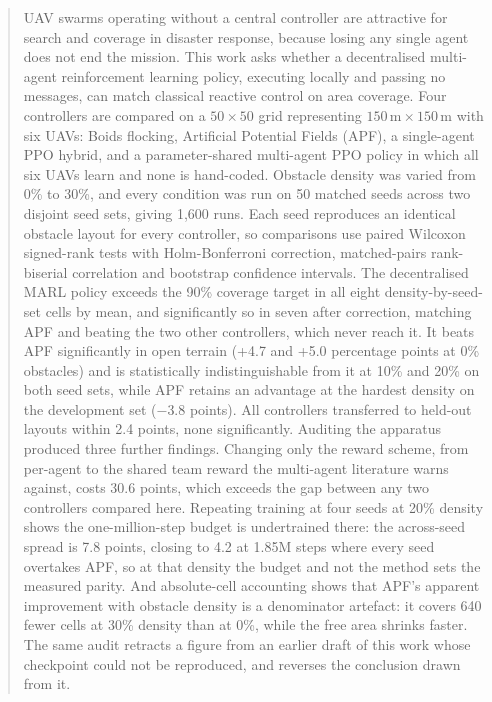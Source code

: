 \documentclass[a4paper, 10pt, conference]{ieeeconf}
\begin{document}
\begin{abstract}
UAV swarms operating without a central controller are attractive for
search and coverage in disaster response, because losing any single
agent does not end the mission. This work asks whether a
decentralised multi-agent reinforcement learning policy, executing
locally and passing no messages, can match classical reactive control
on area coverage. Four controllers are
compared on a $50\times50$ grid representing
$150\,\text{m}\times150\,\text{m}$ with six UAVs: Boids flocking,
Artificial Potential Fields (APF), a single-agent PPO hybrid, and a
parameter-shared multi-agent PPO policy in which all six UAVs learn
and none is hand-coded. Obstacle density was varied from 0\% to 30\%,
and every condition was run on 50 matched seeds across two disjoint
seed sets, giving 1{,}600 runs. Each seed reproduces an identical
obstacle layout for every controller, so comparisons use paired
Wilcoxon signed-rank tests with Holm-Bonferroni correction,
matched-pairs rank-biserial correlation and bootstrap confidence
intervals. The decentralised MARL policy exceeds the 90\%
coverage target in all eight density-by-seed-set cells by mean, and
significantly so in seven after correction, matching APF and beating
the two other controllers, which never reach it. It beats APF significantly in open terrain
(+4.7 and +5.0 percentage points at 0\% obstacles) and is
statistically indistinguishable from it at 10\% and 20\% on both seed
sets, while APF retains an advantage at the hardest density on the
development set ($-3.8$ points). All controllers transferred to
held-out layouts within 2.4 points, none significantly. Auditing the
apparatus produced three further findings. Changing only the reward
scheme, from per-agent to the shared team reward the multi-agent
literature warns against, costs 30.6 points, which exceeds the gap
between any two controllers compared here. Repeating training at four
seeds at 20\% density shows the one-million-step budget is
undertrained there: the across-seed spread is 7.8 points, closing to
4.2 at 1.85M steps where every seed overtakes APF, so at that density
the budget and not the method sets the measured parity. And
absolute-cell accounting shows that APF's apparent improvement with
obstacle density is a denominator artefact: it covers 640 fewer cells
at 30\% density than at 0\%, while the free area shrinks faster. The
same audit retracts a figure from an earlier draft of this work whose
checkpoint could not be reproduced, and reverses the conclusion drawn
from it.
\end{abstract}
\end{document}
